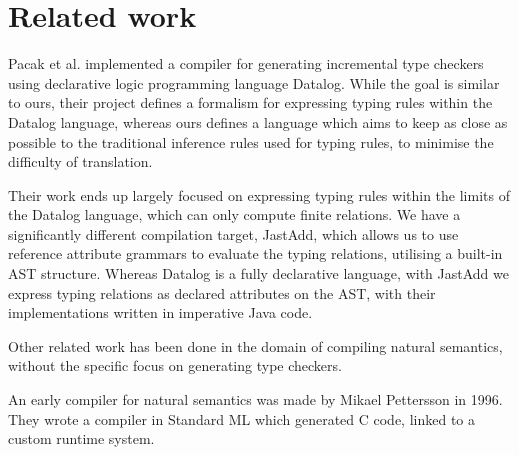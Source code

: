 \documentclass[nofilelist]{cslthse-msc}
\newcommand{\CR}[1]{\textcolor{green!60!black}{[\textbf{CR}:#1]}}
\begin{document}
\chapter{Related work} %
Pacak et al. implemented a compiler for generating incremental type checkers using declarative logic programming language Datalog\cite{Pacak}.
While the goal is similar to ours, their project defines a formalism for expressing typing rules within the Datalog language, whereas ours defines a language which aims to keep as close as possible to the traditional inference rules used for typing rules, to minimise the difficulty of translation.


Their work ends up largely focused on expressing typing rules within the limits of the Datalog language, which can only compute finite relations.
We have a significantly different compilation target, JastAdd, which allows us to use reference attribute grammars to evaluate the typing relations, utilising a built-in AST structure.
Whereas Datalog is a fully declarative language, with JastAdd we express typing relations as declared attributes on the AST, with their implementations written in imperative Java code.

Other related work has been done in the domain of compiling natural semantics, without the specific focus on generating type checkers.

An early compiler for natural semantics was made by Mikael Pettersson in 1996\cite{Pettersson}.
They wrote a compiler in Standard ML which generated C code, linked to a custom runtime system.
\end{document}
